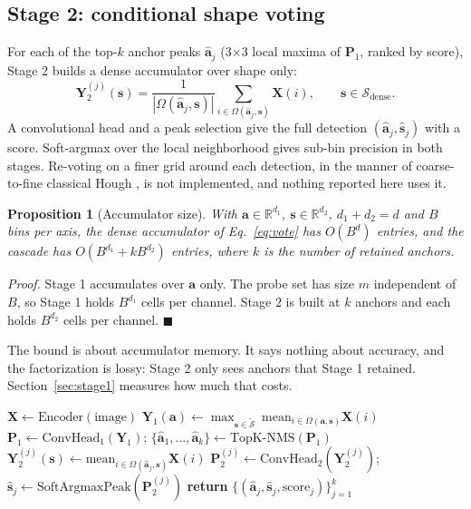 \documentclass[11pt]{article}
\newtheorem{proposition}{Proposition}
\begin{document}
\subsection{Stage 2: conditional shape voting}
For each of the top-$k$ anchor peaks $\hat{\mathbf{a}}_j$ (3$\times$3 local maxima of $\mathbf{P}_1$, ranked by score), Stage 2 builds a dense accumulator over shape only:
\begin{equation}
\mathbf{Y}_2^{(j)}(\mathbf{s})=\frac{1}{|\Omega(\hat{\mathbf{a}}_j,\mathbf{s})|}\sum_{i\in\Omega(\hat{\mathbf{a}}_j,\mathbf{s})}\mathbf{X}(i),\qquad \mathbf{s}\in\mathcal{S}_{\text{dense}}.
\label{eq:stage2}
\end{equation}
A convolutional head and a peak selection give the full detection $(\hat{\mathbf{a}}_j,\hat{\mathbf{s}}_j)$ with a score. Soft-argmax over the local neighborhood gives sub-bin precision in both stages. Re-voting on a finer grid around each detection, in the manner of coarse-to-fine classical Hough \citep{illingworth1987}, is not implemented, and nothing reported here uses it.

\begin{proposition}[Accumulator size]
With $\mathbf{a}\in\mathbb{R}^{d_1}$, $\mathbf{s}\in\mathbb{R}^{d_2}$, $d_1+d_2=d$ and $B$ bins per axis, the dense accumulator of Eq.~\ref{eq:vote} has $O(B^{d})$ entries, and the cascade has $O(B^{d_1}+kB^{d_2})$ entries, where $k$ is the number of retained anchors.
\end{proposition}
\emph{Proof.} Stage 1 accumulates over $\mathbf{a}$ only. The probe set has size $m$ independent of $B$, so Stage 1 holds $B^{d_1}$ cells per channel. Stage 2 is built at $k$ anchors and each holds $B^{d_2}$ cells per channel. $\blacksquare$

The bound is about accumulator memory. It says nothing about accuracy, and the factorization is lossy: Stage 2 only sees anchors that Stage 1 retained. Section~\ref{sec:stage1} measures how much that costs.

\begin{algorithm}[t]
\caption{Factorized deep Hough cascade (inference)}
\label{alg:cascade}
\begin{algorithmic}[1]
\State $\mathbf{X}\gets\text{Encoder}(\text{image})$
  \State $\mathbf{Y}_1(\mathbf{a})\gets\max_{\mathbf{s}\in\tilde{\mathcal{S}}}\ \text{mean}_{i\in\Omega(\mathbf{a},\mathbf{s})}\mathbf{X}(i)$ 
\EndFor
\State $\mathbf{P}_1\gets\text{ConvHead}_1(\mathbf{Y}_1)$; \quad $\{\hat{\mathbf{a}}_1,\dots,\hat{\mathbf{a}}_k\}\gets\text{TopK-NMS}(\mathbf{P}_1)$
    \State $\mathbf{Y}_2^{(j)}(\mathbf{s})\gets\text{mean}_{i\in\Omega(\hat{\mathbf{a}}_j,\mathbf{s})}\mathbf{X}(i)$ 
  \EndFor
  \State $\mathbf{P}_2^{(j)}\gets\text{ConvHead}_2(\mathbf{Y}_2^{(j)})$; \quad $\hat{\mathbf{s}}_j\gets\text{SoftArgmaxPeak}(\mathbf{P}_2^{(j)})$
\EndFor
\State \textbf{return} $\{(\hat{\mathbf{a}}_j,\hat{\mathbf{s}}_j,\text{score}_j)\}_{j=1}^{k}$
\end{algorithmic}
\end{algorithm}
\end{document}
